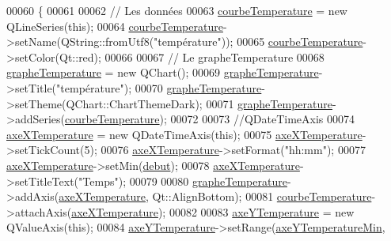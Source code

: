 \begin{DoxyCode}
00060 \{
00061 
00062     \textcolor{comment}{// Les données}
00063     \hyperlink{class_graphique_a6c2f8ef3364123ad300de74db529bd9b}{courbeTemperature} = \textcolor{keyword}{new} QLineSeries(\textcolor{keyword}{this});
00064     \hyperlink{class_graphique_a6c2f8ef3364123ad300de74db529bd9b}{courbeTemperature}->setName(QString::fromUtf8(\textcolor{stringliteral}{"température"}));
00065     \hyperlink{class_graphique_a6c2f8ef3364123ad300de74db529bd9b}{courbeTemperature}->setColor(Qt::red);
00066 
00067     \textcolor{comment}{// Le grapheTemperature}
00068     \hyperlink{class_graphique_ad2fe81a972ee10a20a56300a87a78f24}{grapheTemperature} = \textcolor{keyword}{new} QChart();
00069     \hyperlink{class_graphique_ad2fe81a972ee10a20a56300a87a78f24}{grapheTemperature}->setTitle(\textcolor{stringliteral}{"température"});
00070     \hyperlink{class_graphique_ad2fe81a972ee10a20a56300a87a78f24}{grapheTemperature}->setTheme(QChart::ChartThemeDark);
00071     \hyperlink{class_graphique_ad2fe81a972ee10a20a56300a87a78f24}{grapheTemperature}->addSeries(\hyperlink{class_graphique_a6c2f8ef3364123ad300de74db529bd9b}{courbeTemperature});
00072 
00073     \textcolor{comment}{//QDateTimeAxis}
00074     \hyperlink{class_graphique_a83ef0cdf381f66a6202022b8545bfb1c}{axeXTemperature} = \textcolor{keyword}{new} QDateTimeAxis(\textcolor{keyword}{this});
00075     \hyperlink{class_graphique_a83ef0cdf381f66a6202022b8545bfb1c}{axeXTemperature}->setTickCount(5);
00076     \hyperlink{class_graphique_a83ef0cdf381f66a6202022b8545bfb1c}{axeXTemperature}->setFormat(\textcolor{stringliteral}{"hh:mm"});
00077     \hyperlink{class_graphique_a83ef0cdf381f66a6202022b8545bfb1c}{axeXTemperature}->setMin(\hyperlink{class_graphique_a468d57ae7b14b46558cf25629cced7b6}{debut});
00078     \hyperlink{class_graphique_a83ef0cdf381f66a6202022b8545bfb1c}{axeXTemperature}->setTitleText(\textcolor{stringliteral}{"Temps"});
00079 
00080     \hyperlink{class_graphique_ad2fe81a972ee10a20a56300a87a78f24}{grapheTemperature}->addAxis(\hyperlink{class_graphique_a83ef0cdf381f66a6202022b8545bfb1c}{axeXTemperature}, Qt::AlignBottom);
00081     \hyperlink{class_graphique_a6c2f8ef3364123ad300de74db529bd9b}{courbeTemperature}->attachAxis(\hyperlink{class_graphique_a83ef0cdf381f66a6202022b8545bfb1c}{axeXTemperature});
00082 
00083     \hyperlink{class_graphique_a3df7eeca8d7dba5f528f65d89883736f}{axeYTemperature} = \textcolor{keyword}{new} QValueAxis(\textcolor{keyword}{this});
00084     \hyperlink{class_graphique_a3df7eeca8d7dba5f528f65d89883736f}{axeYTemperature}->setRange(\hyperlink{class_graphique_ad0971f340d49a40c14376a0e0a985f81}{axeYTemperatureMin}, 

\end{DoxyCode}
